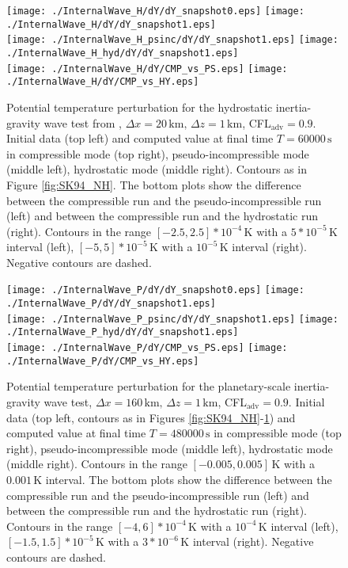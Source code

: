 \documentclass[12pt,a4paper]{article}
\theoremstyle{definition}
\begin{document}
\begin{figure}
\centering
 \texttt{[image: ./InternalWave\_H/dY/dY\_snapshot0.eps]}
 \texttt{[image: ./InternalWave\_H/dY/dY\_snapshot1.eps]}\\
 \texttt{[image: ./InternalWave\_H\_psinc/dY/dY\_snapshot1.eps]}
 \texttt{[image: ./InternalWave\_H\_hyd/dY/dY\_snapshot1.eps]}\\
  \texttt{[image: ./InternalWave\_H/dY/CMP\_vs\_PS.eps]}
 \texttt{[image: ./InternalWave\_H/dY/CMP\_vs\_HY.eps]}
 \caption{Potential temperature perturbation for the hydrostatic inertia-gravity wave test from \cite{SkamarockKlemp1994},  $\Delta x=20\,\textrm{km},\,\Delta z=1\,\textrm{km}$, CFL$_\textrm{adv}=0.9$. Initial data (top left) and computed value at final time $T=60000\,\textrm{s}$ in compressible mode (top right), pseudo-incompressible mode (middle left), hydrostatic mode (middle right). Contours as in Figure \ref{fig:SK94_NH}. The bottom plots show the difference between the compressible run and the pseudo-incompressible run (left) and between the compressible run and the hydrostatic run (right). Contours in the range $[-2.5, 2.5]*10^{-4}\,\textrm{K}$ with a $5*10^{-5}\,\textrm{K}$ interval (left), $[-5, 5]*10^{-5}\,\textrm{K}$  with a $10^{-5}\,\textrm{K}$ interval (right). Negative contours are dashed.}
 \label{fig:SK94_H} 
 \end{figure}

 \begin{figure}
\centering
 \texttt{[image: ./InternalWave\_P/dY/dY\_snapshot0.eps]}
 \texttt{[image: ./InternalWave\_P/dY/dY\_snapshot1.eps]}\\
 \texttt{[image: ./InternalWave\_P\_psinc/dY/dY\_snapshot1.eps]}
 \texttt{[image: ./InternalWave\_P\_hyd/dY/dY\_snapshot1.eps]}\\
  \texttt{[image: ./InternalWave\_P/dY/CMP\_vs\_PS.eps]}
 \texttt{[image: ./InternalWave\_P/dY/CMP\_vs\_HY.eps]}
 \caption{Potential temperature perturbation for the planetary-scale inertia-gravity wave test,  $\Delta x=160\,\textrm{km},\,\Delta z=1\,\textrm{km}$, CFL$_\textrm{adv}=0.9$. Initial data (top left, contours as in Figures \ref{fig:SK94_NH}-\ref{fig:SK94_H}) and computed value at final time $T=480000\,\textrm{s}$ in compressible mode (top right), pseudo-incompressible mode (middle left), hydrostatic mode (middle right). Contours in the range $[-0.005, 0.005]\,\textrm{K}$ with a $0.001\,\textrm{K}$ interval. The bottom plots show the difference between the compressible run and the pseudo-incompressible run (left) and between the compressible run and the hydrostatic run (right). Contours in the range $[-4, 6]*10^{-4}\,\textrm{K}$ with a $10^{-4}\,\textrm{K}$ interval (left), $[-1.5, 1.5]*10^{-5}\,\textrm{K}$ with a $3*10^{-6}\,\textrm{K}$ interval (right). Negative contours are dashed.}
 \label{fig:SK94_P} 
 \end{figure}
\end{document}

